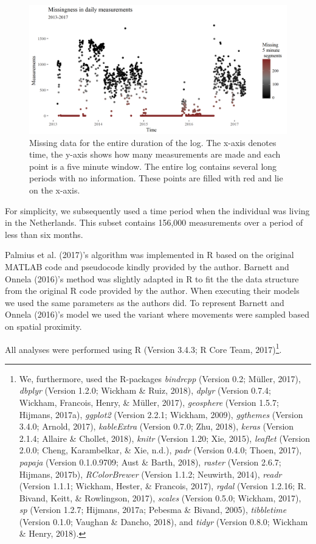 \documentclass[man]{apa6}
\theoremstyle{definition}
\theoremstyle{definition}
\theoremstyle{definition}
\theoremstyle{remark}
\begin{document}
\begin{figure}
\includegraphics[width=1\linewidth]{img/missingdayBoaz5min} \caption{Missing data for the entire duration of the log. The x-axis denotes time, the y-axis shows how many measurements are made and each point is a five minute window. The entire log contains several long periods with no information. These points are filled with red and lie on the x-axis.}\label{fig:measurementsPerDay}
\end{figure}

For simplicity, we subsequently used a time period when the individual
was living in the Netherlands. This subset contains 156,000 measurements
over a period of less than six months.

Palmius et al. (2017)'s algorithm was implemented in R based on the
original MATLAB code and pseudocode kindly provided by the author.
Barnett and Onnela (2016)'s method was slightly adapted in R to fit the
the data structure from the original R code provided by the author. When
executing their models we used the same parameters as the authors did.
To represent Barnett and Onnela (2016)'s model we used the variant where
movements were sampled based on spatial proximity.

All analyses were performed using R (Version 3.4.3; R Core Team,
2017)\footnote{We, furthermore, used the R-packages \emph{bindrcpp}
  (Version 0.2; Müller, 2017), \emph{dbplyr} (Version 1.2.0; Wickham \&
  Ruiz, 2018), \emph{dplyr} (Version 0.7.4; Wickham, Francois, Henry, \&
  Müller, 2017), \emph{geosphere} (Version 1.5.7; Hijmans, 2017a),
  \emph{ggplot2} (Version 2.2.1; Wickham, 2009), \emph{ggthemes}
  (Version 3.4.0; Arnold, 2017), \emph{kableExtra} (Version 0.7.0; Zhu,
  2018), \emph{keras} (Version 2.1.4; Allaire \& Chollet, 2018),
  \emph{knitr} (Version 1.20; Xie, 2015), \emph{leaflet} (Version 2.0.0;
  Cheng, Karambelkar, \& Xie, n.d.), \emph{padr} (Version 0.4.0; Thoen,
  2017), \emph{papaja} (Version 0.1.0.9709; Aust \& Barth, 2018),
  \emph{raster} (Version 2.6.7; Hijmans, 2017b), \emph{RColorBrewer}
  (Version 1.1.2; Neuwirth, 2014), \emph{readr} (Version 1.1.1; Wickham,
  Hester, \& Francois, 2017), \emph{rgdal} (Version 1.2.16; R. Bivand,
  Keitt, \& Rowlingson, 2017), \emph{scales} (Version 0.5.0; Wickham,
  2017), \emph{sp} (Version 1.2.7; Hijmans, 2017a; Pebesma \& Bivand,
  2005), \emph{tibbletime} (Version 0.1.0; Vaughan \& Dancho, 2018), and
  \emph{tidyr} (Version 0.8.0; Wickham \& Henry, 2018).}.
\end{document}
